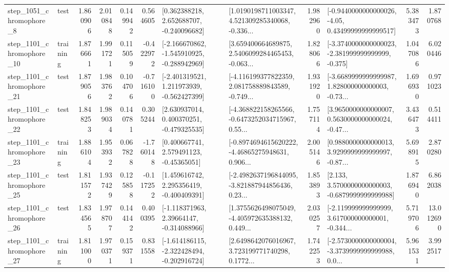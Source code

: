 \begin{tabular}{llrrrrllrlrr}
  step\_1051\_chromophore\_8 &      test &      1.860906 &    2.010848 &      0.149942 &  0.564605 &    [0.362388218, 2.652688707, -0.240096682] &  [1.0190198711003347, 4.521309285340068, -0.336... &       1.982960 &  [-0.9440000000000026, -4.05, 0.43499999999999517] &            5.383473 &          1.870768 \\
 step\_1101\_chromophore\_10 &  training &      1.876661 &    1.991721 &      0.115059 & -0.422972 &  [-2.166670862, -1.545910925, -0.288942969] &  [3.659400664689875, 2.5406099284465453, -0.063... &       1.828066 &  [-3.3740000000000023, -2.381999999999999, -0.375] &            1.047086 &          6.020446 \\
 step\_1101\_chromophore\_21 &      test &      1.879056 &    1.983762 &      0.104706 & -0.716100 &   [-2.401319521, 1.211973939, -0.562427399] &  [-4.116199377822359, 2.081758889843589, -0.749... &       1.931920 &  [-3.6689999999999987, 1.828000000000003, -0.73... &            1.696930 &          0.971023 \\
 step\_1101\_chromophore\_22 &      test &      1.848253 &    1.989034 &      0.140781 &  0.305244 &    [2.630937014, 0.400370251, -0.479325535] &  [-4.368822158265566, -0.6473252034715967, 0.55... &       1.757114 &  [3.9650000000000007, 0.5630000000000024, -0.47... &            3.436473 &          0.514411 \\
 step\_1101\_chromophore\_23 &  training &      1.886104 &    1.953932 &      0.067828 & -1.760148 &     [0.400667741, 2.579491123, -0.45365051] &  [-0.8974694615620222, -4.46865275948631, 0.906... &       2.005146 &  [0.9880000000000013, 3.9299999999999997, -0.87... &            5.698915 &          2.870280 \\
 step\_1101\_chromophore\_25 &      test &      1.811572 &    1.937429 &      0.125858 & -0.117252 &    [1.459616742, 2.295356419, -0.400409391] &  [-2.4982637196844095, -3.821887944856436, 0.23... &       1.853893 &   [2.133, 3.5700000000000003, -0.6879999999999988] &            1.876940 &          6.862038 \\
 step\_1101\_chromophore\_26 &      test &      1.834565 &    1.978707 &      0.144142 &  0.400395 &    [-1.118371963, 2.39664147, -0.314088966] &  [1.3755626498075049, -4.405972635388132, 0.449... &       2.030257 &  [-2.119999999999999, 3.617000000000001, -0.344... &            5.719706 &         13.012690 \\
 step\_1101\_chromophore\_27 &  training &      1.811000 &    1.970371 &      0.159371 &  0.831558 &  [-1.614186115, -2.322428494, -0.202916724] &  [2.6498642076016967, 3.723199771740298, 0.1772... &       1.742253 &  [-2.5730000000000004, -3.3739999999999988, 0.0... &            5.961531 &          3.992517 \\

\end{tabular}
